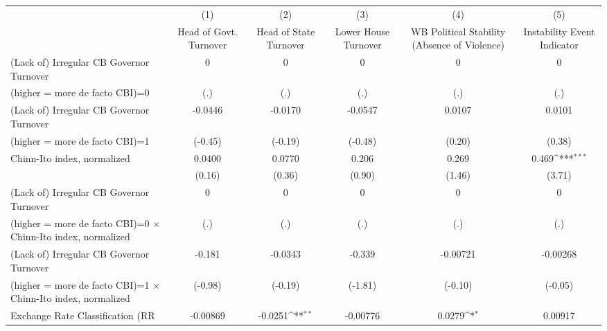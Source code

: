 {
\def\sym#1{\ifmmode^{#1}\else\(^{#1}\)\fi}
\begin{tabular}{l*{5}{c}}
\toprule
                                        &\multicolumn{1}{c}{(1)}&\multicolumn{1}{c}{(2)}&\multicolumn{1}{c}{(3)}&\multicolumn{1}{c}{(4)}&\multicolumn{1}{c}{(5)}\\
                                        &\multicolumn{1}{c}{Head of Govt. Turnover}&\multicolumn{1}{c}{Head of State Turnover}&\multicolumn{1}{c}{Lower House Turnover}&\multicolumn{1}{c}{WB Political Stability (Absence of Violence)}&\multicolumn{1}{c}{Instability Event Indicator}\\
\midrule
(Lack of) Irregular CB Governor Turnover&        0         &        0         &        0         &        0         &        0         \\
(higher = more de facto CBI)=0          &      (.)         &      (.)         &      (.)         &      (.)         &      (.)         \\
\addlinespace
(Lack of) Irregular CB Governor Turnover&  -0.0446         &  -0.0170         &  -0.0547         &   0.0107         &   0.0101         \\
(higher = more de facto CBI)=1          &  (-0.45)         &  (-0.19)         &  (-0.48)         &   (0.20)         &   (0.38)         \\
\addlinespace
Chinn-Ito index, normalized             &   0.0400         &   0.0770         &    0.206         &    0.269         &    0.469\sym{***}\\
                                        &   (0.16)         &   (0.36)         &   (0.90)         &   (1.46)         &   (3.71)         \\
\addlinespace
(Lack of) Irregular CB Governor Turnover&        0         &        0         &        0         &        0         &        0         \\
(higher = more de facto CBI)=0 $\times$ Chinn-Ito index, normalized&      (.)         &      (.)         &      (.)         &      (.)         &      (.)         \\
\addlinespace
(Lack of) Irregular CB Governor Turnover&   -0.181         &  -0.0343         &   -0.339         & -0.00721         & -0.00268         \\
(higher = more de facto CBI)=1 $\times$ Chinn-Ito index, normalized&  (-0.98)         &  (-0.19)         &  (-1.81)         &  (-0.10)         &  (-0.05)         \\
\addlinespace
Exchange Rate Classification (RR        & -0.00869         &  -0.0251\sym{**} & -0.00776         &   0.0279\sym{*}  &  0.00917         \\

\end{tabular}}
